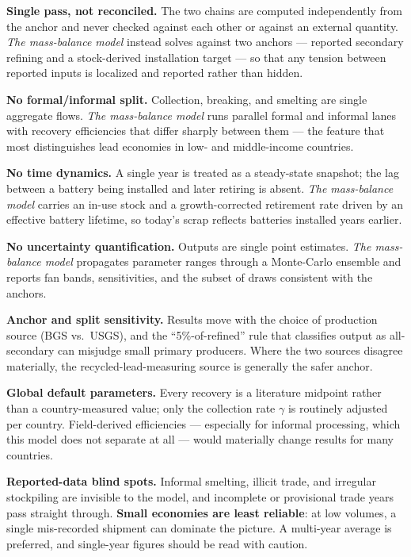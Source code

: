 \documentclass[11pt,a4paper]{article}
\begin{document}
\textbf{Single pass, not reconciled.} The two chains are computed independently from the
anchor and never checked against each other or against an external quantity. \emph{The
mass-balance model} instead solves against two anchors --- reported secondary refining
and a stock-derived installation target --- so that any tension between reported inputs
is localized and reported rather than hidden.

\textbf{No formal/informal split.} Collection, breaking, and smelting are single
aggregate flows. \emph{The mass-balance model} runs parallel formal and informal lanes
with recovery efficiencies that differ sharply between them --- the feature that most
distinguishes lead economies in low- and middle-income countries.

\textbf{No time dynamics.} A single year is treated as a steady-state snapshot; the
lag between a battery being installed and later retiring is absent. \emph{The
mass-balance model} carries an in-use stock and a growth-corrected retirement rate
driven by an effective battery lifetime, so today's scrap reflects batteries installed
years earlier.

\textbf{No uncertainty quantification.} Outputs are single point estimates. \emph{The
mass-balance model} propagates parameter ranges through a Monte-Carlo ensemble and
reports fan bands, sensitivities, and the subset of draws consistent with the anchors.

\begin{openitem}
\textbf{Anchor and split sensitivity.} Results move with the choice of production
source (BGS vs.\ USGS), and the ``5\%-of-refined'' rule that classifies output as
all-secondary can misjudge small primary producers. Where the two sources disagree
materially, the recycled-lead-measuring source is generally the safer anchor.
\end{openitem}

\begin{openitem}
\textbf{Global default parameters.} Every recovery is a literature midpoint rather than
a country-measured value; only the collection rate $\gamma$ is routinely adjusted per
country. Field-derived efficiencies --- especially for informal processing, which this
model does not separate at all --- would materially change results for many countries.
\end{openitem}

\begin{openitem}
\textbf{Reported-data blind spots.} Informal smelting, illicit trade, and irregular
stockpiling are invisible to the model, and incomplete or provisional trade years pass
straight through. \textbf{Small economies are least reliable}: at low volumes, a single
mis-recorded shipment can dominate the picture. A multi-year average is preferred, and
single-year figures should be read with caution.
\end{openitem}
\end{document}
